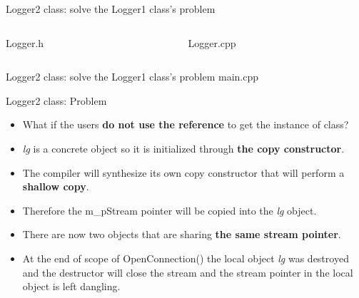 \documentclass[13pt]{beamer}
\begin{document}
\begin{frame}{Logger2 class: solve the Logger1 class's problem}
\begin{columns}[T]
\begin{column}{.45\textwidth}
Logger.h
\lstset{basicstyle=\tiny,style=myCustomCppStyle}

\end{column}

\begin{column}{.45\textwidth}
Logger.cpp
\lstset{basicstyle=\tiny,style=myCustomCppStyle}

\end{column}
\end{columns}
\end{frame}

\begin{frame}{Logger2 class: solve the Logger1 class's problem}
main.cpp
\lstset{basicstyle=\tiny,style=myCustomCppStyle}

\end{frame}

\begin{frame}{Logger2 class: Problem}
\begin{itemize}
\setlength\itemsep{1em}

\item What if the users \textbf{do not use the reference} to get the instance of class?

\item \textit{lg} is a concrete object so it is initialized through \textbf{the copy constructor}.

\item The compiler will synthesize its own copy constructor that will perform a \textbf{shallow copy}.

\item Therefore the m\_pStream pointer will be copied into the \textit{lg} object.

\item There are now two objects that are sharing \textbf{the same stream pointer}.

\item At the end of scope of OpenConnection() the local object \textit{lg} was       destroyed and the destructor will close the stream and the stream pointer in the local object is left dangling.
\end{itemize}
\end{frame}
\end{document}
